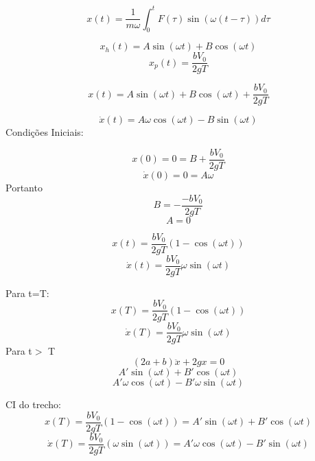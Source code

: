 

\[x(t)=\frac{1}{m\omega} \int _{0}^{t} {F(\tau)\sin(\omega(t-\tau))d\tau}\]

\[x_{h}(t)=A\sin(\omega t)+B\cos(\omega t)\]
\[x_{p}(t)=\frac{bV_{0}}{2gT}\]

\[x(t)=A\sin(\omega t)+B\cos(\omega t)+\frac{bV_{0}}{2gT}\]

\[\dot{x}(t)=A\omega \cos(\omega t)-B\sin(\omega t)\]
Condições Iniciais:

\[x(0)=0=B+\frac{bV_{0}}{2gT}\]
\[\dot{x}(0)=0=A\omega\]
Portanto
\[B=-\frac{-bV_{0}}{2gT}\]
\[A=0\]

\[x(t)=\frac{bV_{0}}{2gT}(1-\cos(\omega t))\]
\[\dot{x} (t)=\frac{bV_{0}}{2gT}\omega \sin(\omega t)\]



Para t=T:
\[x(T)=\frac{bV_{0}}{2gT}(1-\cos(\omega t))\]
\[\dot{x}(T)=\frac{bV_{0}}{2gT}\omega \sin(\omega t)\]
Para t$>$ T
\[(2a+b)\ddot{x}+2gx=0\]
\[A'\sin(\omega t)+B'\cos(\omega t)\]
\[A' \omega\cos(\omega t)-B' \omega\sin(\omega t)\]

CI do trecho:
\[x(T)=\frac{bV_{0}}{2gT}(1-\cos(\omega t))=A'\sin(\omega t)+B'\cos(\omega t)\]
\[\dot{x}(T)=\frac{bV_{0}}{2gT}(\omega \sin(\omega t))=A' \omega\cos(\omega t)-B'\sin(\omega t)\]